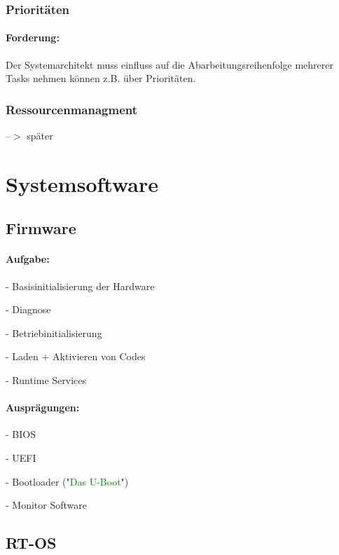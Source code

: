 \documentclass[12pt,a4paper,oneside,ngerman]{article}
\begin{document}
\subsubsection{Prioritäten}
\paragraph{Forderung:}
Der Systemarchitekt muss einfluss auf die Abarbeitungsreihenfolge mehrerer Tasks nehmen können z.B. über Prioritäten.

\subsubsection{Ressourcenmanagment}
--$>$ später

\section[Systemsoftware]{Systemsoftware}
\subsection{Firmware}
\paragraph{Aufgabe:}
\begin{description}
	\item - Basisinitialisierung der Hardware
	\item - Diagnose
	\item - Betriebinitialisierung
	\item - Laden + Aktivieren von Codes
	\item - Runtime Services
\end{description}
\paragraph{Ausprägungen:}
\begin{description}
	\item - BIOS
	\item - UEFI
	\item - Bootloader ("\textcolor{green}{Das U-Boot}")
	\item - Monitor Software
\end{description}

\subsection{RT-OS}
\end{document}

